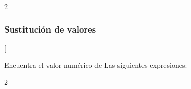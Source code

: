 \documentclass[12pt,addpoints,answers]{repaso}
\begin{document}
\begin{questions}
{\begin{multicols}{2}
        \end{multicols}
    }


     \subsubsection{Sustitución de valores}
    \ejemplosboxed[{Encuentra el valor numérico de Las siguientes expresiones:

                \begin{multicols}{2}
                    \begin{parts}

\end{parts}
\end{multicols}}
\end{questions}
\end{document}
